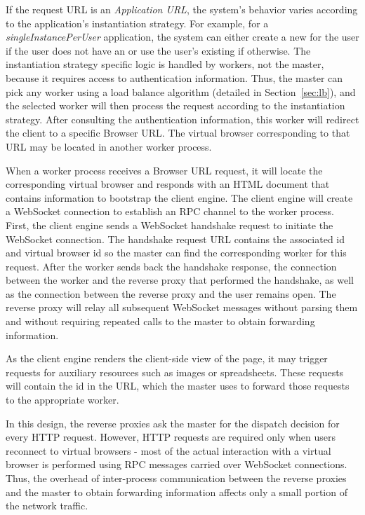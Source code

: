 If the request URL is an \emph{Application URL}, 
the system's behavior varies according to the application's instantiation strategy.
For example, for a \emph{singleInstancePerUser} application,
the system can either create a new \appins{} for the user if the user does not have an
\appins or use the user's existing \appins{} if otherwise.
The instantiation strategy specific logic is handled by workers, not the master,
because it requires access to authentication information.
Thus, the master can pick any worker using a load
balance algorithm (detailed in Section~\ref{sec:lb}),
and the selected worker will then process the request according
to the instantiation strategy.
After consulting the authentication information, this worker will redirect 
the client to a specific Browser URL.   The virtual browser corresponding
to that URL may be located in another worker process.

When a worker process receives a Browser URL request, it will locate the
corresponding virtual browser and responds with an HTML document that contains
information to bootstrap the client engine. 
The client engine will create a WebSocket connection to establish an RPC channel to
the worker process.
First, the client engine sends a WebSocket handshake request to initiate the
WebSocket connection.
The handshake request URL contains the associated \appins id and virtual browser
id so the master can find the corresponding worker for this request.
After the worker sends back the handshake response, the connection
between the worker and the reverse proxy that performed the handshake, 
as well as the connection between the reverse proxy and the user remains open. 
The reverse proxy will relay all subsequent WebSocket messages
without parsing them and without requiring repeated calls to the master
to obtain forwarding information.

As the client engine renders the client-side view of the page, it may trigger
requests for auxiliary resources such as images or spreadsheets. 
These requests will contain the \appins{} id in the URL, which the master
uses to forward those requests to the appropriate worker.


In this design, the reverse proxies ask the master for the dispatch decision
for every HTTP request.  However, HTTP requests are required only when users
reconnect to virtual browsers - most of the actual interaction with a virtual
browser is performed using RPC messages carried over WebSocket connections.
Thus, the overhead of inter-process communication between the reverse proxies and
the master to obtain forwarding information affects only a small portion of the network traffic. 

